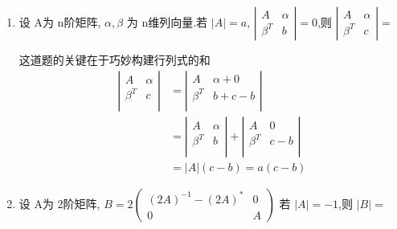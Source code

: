 \documentclass[12pt, a4paper, oneside, UTF8]{ctexbook}
\begin{document}
\begin{enumerate}[label=\arabic*.,start=7]
    \item 设 A为 n阶矩阵, $\alpha,\beta$ 为 n维列向量.若 $|A|=a$,
    $\left|\begin{array}{ll}A & \alpha \\ \beta^{T} & b\end{array}\right|=0$,则
    $\left|\begin{array}{ll}A & \alpha \\ \beta^{T} & c\end{array}\right|=$ \underline{\hspace{3cm}}
    
    \begin{solution}
    这道题的关键在于巧妙构建行列式的和
    \begin{align*}
        \left|\begin{array}{rr}
            A & \alpha \\
            \beta^{T} & c\\
        \end{array} 
        \right| 
        &= \left|\begin{array}{rr}
            A & \alpha + 0 \\
            \beta^{T} & b + c -b\\
        \end{array}\right|  \\
        &=\left|\begin{array}{rr}
            A & \alpha \\
            \beta^{T} & b\\
        \end{array}\right| + 
        \left|\begin{array}{rr}
            A & 0 \\
            \beta^{T} & c-b\\
        \end{array}\right| \\
        &=\left|A\right|(c-b) = a(c-b)
    \end{align*}
    \end{solution}
    
    \newpage
    \item 设 A为 2阶矩阵, 
    $B=2\left(
    \begin{array}{ll}
        (2A)^{-1}-(2A)^* & 0 \\
        0 & A
    \end{array}\right)
    $
    若 $|A|=-1$,则 $|B|=$ \underline{\hspace{3cm}}
    

\end{enumerate}
\end{document}
